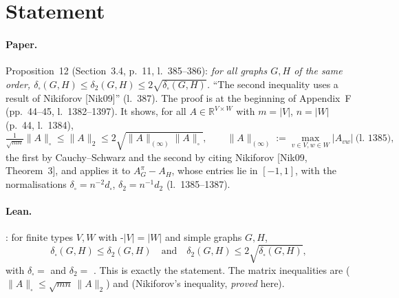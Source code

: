 

\paperversion

\section{Statement}

\paragraph{Paper.} Proposition~12 (Section~3.4, p.~11, l.~385--386): \emph{for all graphs $G,H$ of the same order,
$\delta_\square(G,H)\le\delta_2(G,H)\le2\sqrt{\delta_\square(G,H)}$.} ``The second inequality uses a result of
Nikiforov [Nik09]'' (l.~387). The proof is at the beginning of Appendix~F (pp.~44--45, l.~1382--1397). It shows, for all
$A\in\mathbb R^{V\times W}$ with $m=|V|$, $n=|W|$ (p.~44, l.~1384),
\[ \tfrac1{\sqrt{mn}}\|A\|_\square\le\|A\|_2\le2\sqrt{\|A\|_{(\infty)}\|A\|_\square},
   \qquad \|A\|_{(\infty)}:=\max_{v\in V,w\in W}|A_{vw}| \ \text{(l.~1385)}, \]
the first by Cauchy--Schwarz and the second by citing Nikiforov [Nik09, Theorem~3], and applies it to
$A^\pi_G-A_H$, whose entries lie in $[-1,1]$, with the normalisations $\delta_\square=n^{-2}d_\square$,
$\delta_2=n^{-1}d_2$ (l.~1385--1387).

\paragraph{Lean.} : for finite types $V,W$ with \hyp{$|V|=|W|$} and simple graphs
$G,H$,
\[ \delta_\square(G,H)\le\delta_2(G,H)\quad\text{and}\quad\delta_2(G,H)\le2\sqrt{\delta_\square(G,H)}, \]
with $\delta_\square=$  and $\delta_2=$ . This is exactly the statement.
The matrix inequalities are  ($\|A\|_\square\le\sqrt{mn}\,\|A\|_2$) and
 (Nikiforov's inequality, \emph{proved} here).

